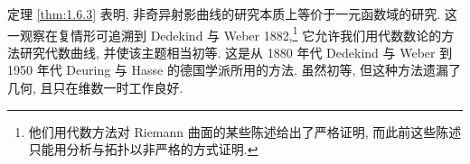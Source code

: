 \begin{aside} \label{thm:1.6.6} 
定理 \ref{thm:1.6.3} 表明, 非奇异射影曲线的研究本质上等价于一元函数域的研究. 这一观察在复情形可追溯到 Dedekind 与 Weber 1882,\footnote{他们用代数方法对 Riemann 曲面的某些陈述给出了严格证明, 而此前这些陈述只能用分析与拓扑以非严格的方式证明.} 它允许我们用代数数论的方法研究代数曲线, 并使该主题相当初等. 这是从 1880 年代 Dedekind 与 Weber 到 1950 年代 Deuring 与 Hasse 的德国学派所用的方法. 虽然初等, 但这种方法遗漏了几何, 且只在维数一时工作良好.
\end{aside}
